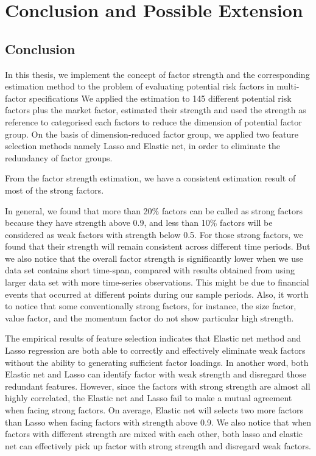 	\chapter{Conclusion and Possible Extension}\label{Conclusion}
		\section{Conclusion}
In this thesis, we implement the concept of factor strength and the corresponding estimation method to the problem of evaluating potential risk factors in multi-factor specifications 
We applied the estimation to 145 different potential risk factors plus the market factor, estimated their strength and used the strength as reference to categorised each factors to reduce the dimension of potential factor group.
On the basis of dimension-reduced factor group, we applied two feature selection methods namely Lasso and Elastic net, in order to eliminate the redundancy of factor groups. 

From the factor strength estimation, we have a consistent estimation result of most of the strong factors.

In general, we found that more than 20\% factors can be called as strong factors because they have strength above 0.9, and less than 10\% factors will be considered as weak factors with strength below 0.5.
For those strong factors, we found that their strength will remain consistent across different time periods.
But we also notice that the overall factor strength is significantly lower when we use data set contains short time-span, compared with results obtained from using larger data set with more time-series observations.
This might be due to financial events that occurred at different points during our sample periods.
Also, it worth to notice that some conventionally strong factors, for instance, the size factor, value factor, and the momentum factor do not show particular high strength.

The empirical results of feature selection indicates that Elastic net method and Lasso regression are both able to correctly and effectively eliminate weak factors without the ability to generating sufficient factor loadings.
In another word, both Elastic net and Lasso can identify factor with weak strength and disregard those redundant features.
However, since the factors with strong strength are almost all highly correlated, the Elastic net and Lasso fail to make a mutual agreement when facing strong factors.
On average, Elastic net will selects two more factors than Lasso when facing factors with strength above 0.9.
We also notice that when factors with different strength are mixed with each other, both lasso and elastic net can effectively pick up factor with strong strength and disregard weak factors.

